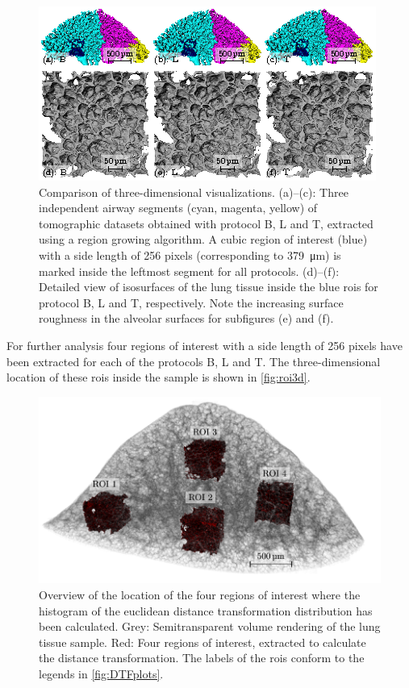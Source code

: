 \begin{figure}
	\centering
	\includegraphics[width=\linewidth]{img/Haberthuer2010/Fig07-B-L-T}
	\caption[Comparison of three-dimensional visualizations]{Comparison of three-dimensional visualizations. %
			(a)--(c): Three independent airway segments (cyan, magenta, yellow) of tomographic datasets obtained with protocol B, L and T, extracted using a region growing algorithm. A cubic region of interest (blue) with a side length of 256 pixels (corresponding to \SI{379}{\micro\meter}) is marked inside the leftmost segment for all protocols. %
			(d)--(f): Detailed view of isosurfaces of the lung tissue inside the blue \acp{roi} for protocol B, L and T, respectively. Note the increasing surface roughness in the alveolar surfaces for subfigures (e) and (f).}%
	\label{fig:BvsT}
\end{figure}%

For further analysis four regions of interest with a side length of 256 pixels have been extracted for each of the protocols B, L and T. The three-dimensional location of these \acp{roi} inside the sample is shown in \autoref{fig:roi3d}.

\begin{figure}
	\centering
	\includegraphics[width=\linewidth]{img/Haberthuer2010/Fig08-ROIs}
	\caption[Overview of the location of the four regions of interest in the sample]{Overview of the location of the four regions of interest where the histogram of the euclidean distance transformation distribution has been calculated. Grey: Semitransparent volume rendering of the lung tissue sample. Red: Four regions of interest, extracted to calculate the distance transformation. The labels of the \acp{roi} conform to the legends in \autoref{fig:DTFplots}.}%
	\label{fig:roi3d}
\end{figure}

